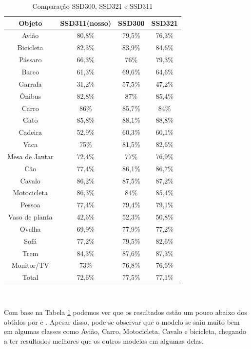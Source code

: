   \begin{table}[H]
    \centering
    \footnotesize
    \setlength{\abovecaptionskip}{0pt}
    \setlength{\belowcaptionskip}{0pt}
    \caption[Resultados SSD]{Comparação SSD300, SSD321 e SSD311}
    \label{tab:resultados}
    \begin{tabular}{c|c|c|c}
	Objeto &	SSD311(nosso) & SSD300 & SSD321 \\ 
	\hline 
 	Avião 			& 80,8\%	& 79,5\% 	& 76,3\% \\ 
	Bicicleta 		& 82,3\%	& 83,9\% 	& 84,6\%  \\ 
	Pássaro 		& 66,3\%	& 76\%  	& 79,3\%  \\
	Barco 			& 61,3\%	& 69,6\% 	& 64,6\%  \\ 
	Garrafa 		& 31,2\%	& 57,5\%  	& 47,2\%  \\ 
	Ônibus 			& 82,8\%	& 87\%	 	& 85,4\%  \\
	Carro 			& 86\%		& 85,7\%  	& 84\%  \\ 
	Gato 			& 85,8\%	& 88,1\%  	& 88,8\%  \\
	Cadeira 		& 52,9\%	& 60,3\%  	& 60,1\%  \\ 
	Vaca 			& 75\% 		& 81,5\% 	& 82,6\%  \\
	Mesa de Jantar 	& 72,4\% 	& 77\%  	& 76,9\%  \\ 
	Cão 			& 77,4\% 	& 86,1\% 	& 86,7\%  \\
	Cavalo 			& 86,2\% 	& 87,5\% 	& 87,2\%  \\ 
	Motocicleta 	& 86,3\% 	& 84\%  	& 85,4\%  \\
	Pessoa 			& 77,4\% 	& 79,4\%  	& 79,1\%  \\ 
	Vaso de planta 	& 42,6\% 	& 52,3\%  	& 50,8\%  \\
	Ovelha 			& 69,9\%	& 77,9\%  	& 77,2\%  \\
	Sofá 			& 77,2\% 	& 79,5\%  	& 82,6\%  \\
	Trem 			& 84,3\% 	& 87,6\%  	& 87,3\%  \\
	Monitor/TV 		& 73\% 		& 76,8\%  	& 76,6\%  \\ 
	Total 			& 72,6\% 	& 77,5\%  	& 77,1\%  \\
    \end{tabular}
    \\
  \end{table}

Com base na Tabela \ref{tab:resultados} podemos ver que os resultados estão um pouco abaixo dos obtidos por  e . Apesar disso, pode-se observar que o modelo se saiu muito bem em algumas classes como Avião, Carro, Motocicleta, Cavalo e bicicleta, chegando a ter resultados melhores que os outros modelos em algumas delas.

